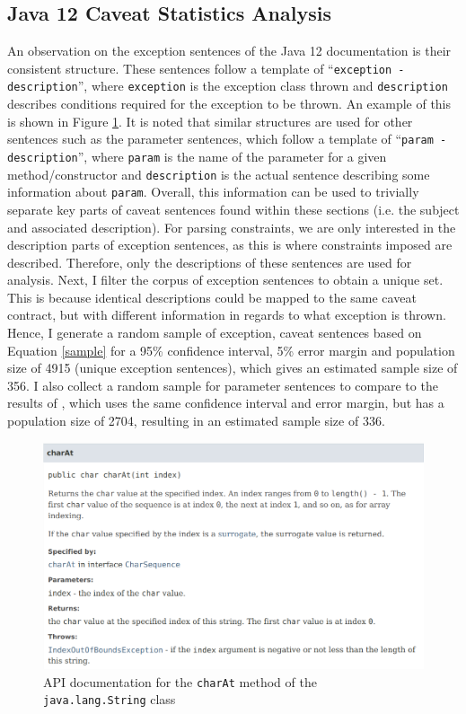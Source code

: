 \subsection{Java 12 Caveat Statistics Analysis}
\label{subsec:contract-caveat-statistics}
An observation on the exception sentences of the Java 12 documentation is their consistent structure. These sentences follow a template of ``\verb|exception - description|'', where \verb|exception| is the exception class thrown and \verb|description| describes conditions required for the exception to be thrown. An example of this is shown in Figure \ref{fig:api-doc-charAt}. It is noted that similar structures are used for other sentences such as the parameter sentences, which follow a template of ``\verb|param - description|'', where \verb|param| is the name of the parameter for a given method/constructor and \verb|description| is the actual sentence describing some information about \verb|param|.  Overall, this information can be used to trivially separate key parts of caveat sentences found within these sections (i.e. the subject and associated description). For parsing constraints, we are only interested in the description parts of exception sentences, as this is where constraints imposed are described. Therefore, only the descriptions of these sentences are used for analysis. Next, I filter the corpus of exception sentences to obtain a unique set. This is because identical descriptions could be mapped to the same caveat contract, but with different information in regards to what exception is thrown.  
Hence, I generate a random sample of exception, caveat sentences based on Equation \ref{sample} for a 95\% confidence interval, 5\% error margin and population size of 4915 (unique exception sentences), which gives an estimated sample size of 356. I also collect a random sample for parameter sentences to compare to the results of \cite{zhou-directive}, which uses the same confidence interval and error margin, but has a population size of 2704, resulting in an estimated sample size of 336.\\

\begin{figure}[h]
	\label{fig:api-doc-charAt}
	\centering
	\includegraphics[width=\textwidth]{figs/api-doc-charAt.png}
	\caption{API documentation for the \lstinline{charAt} method of the \lstinline{java.lang.String} class}
\end{figure}

